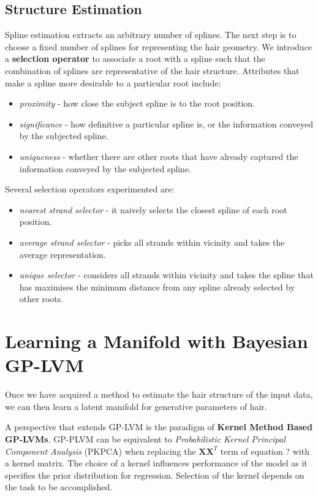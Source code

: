 \documentclass[ %
author={Dillon Keith Diep},
supervisor={Dr. Carl Henrik Ek},
degree={MEng},
title={ART-CG:},
subtitle={Assisted Real-time Content Generation of 3D Hair by Learning Manifolds},
type={Research},
year={2017} ]{dissertation}
\begin{document}
\subsection{Structure Estimation}
Spline estimation extracts an arbitrary number of splines. The next step is to choose a fixed number of splines for representing the hair geometry. We introduce a \textbf{selection operator} to associate a root with a spline such that the combination of splines are representative of the hair structure. Attributes that make a spline more desirable to a particular root include:
\begin{itemize}
	\item \textit{proximity} - how close the subject spline is to the root position.
	\item \textit{significance} - how definitive a particular spline is, or the information conveyed by the subjected spline.
	\item \textit{uniqueness} - whether there are other roots that have already captured the information conveyed by the subjected spline.
\end{itemize}
Several selection operators experimented are:
\begin{itemize}
	\item \textit{nearest strand selector} - it naively selects the closest spline of each root position. 
	\item \textit{average strand selector} - picks all strands within vicinity and takes the average representation.
	\item \textit{unique selector} - considers all strands within vicinity and takes the spline that has maximises the minimum distance from any spline already selected by other roots.
\end{itemize}

\section{Learning a Manifold with Bayesian GP-LVM}
Once we have acquired a method to estimate the hair structure of the input data, we can then learn a latent manifold for generative parameters of hair.

A perspective that extends GP-LVM is the paradigm of \textbf{Kernel Method Based GP-LVMs}. \cite{reviewgplvm}  GP-PLVM can be equivalent to \textit{Probabilistic Kernel Principal Component Analysis} (PKPCA) when replacing the $\bm{XX}^T$ term of equation ? with a kernel matrix. The choice of a kernel influences performance of the model as it specifies the prior distribution for regression. Selection of the kernel depends on the task to be accomplished.
\end{document}
